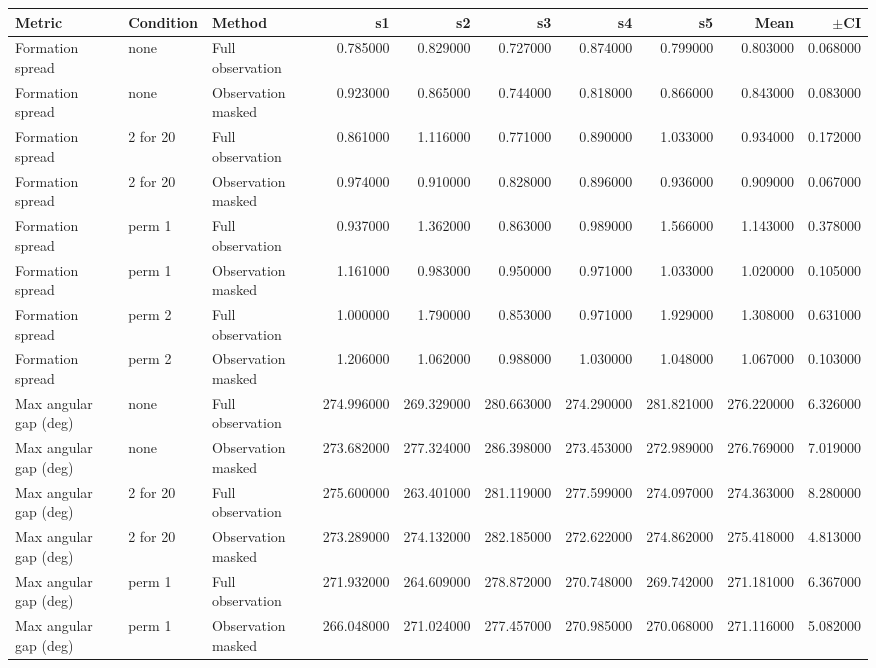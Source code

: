 \begin{tabular}{lllrrrrrrr}
\toprule
Metric & Condition & Method & s1 & s2 & s3 & s4 & s5 & Mean & $\pm$CI \\
\midrule
Formation spread & none & Full observation & 0.785000 & 0.829000 & 0.727000 & 0.874000 & 0.799000 & 0.803000 & 0.068000 \\
Formation spread & none & Observation masked & 0.923000 & 0.865000 & 0.744000 & 0.818000 & 0.866000 & 0.843000 & 0.083000 \\
Formation spread & 2 for 20 & Full observation & 0.861000 & 1.116000 & 0.771000 & 0.890000 & 1.033000 & 0.934000 & 0.172000 \\
Formation spread & 2 for 20 & Observation masked & 0.974000 & 0.910000 & 0.828000 & 0.896000 & 0.936000 & 0.909000 & 0.067000 \\
Formation spread & perm  1 & Full observation & 0.937000 & 1.362000 & 0.863000 & 0.989000 & 1.566000 & 1.143000 & 0.378000 \\
Formation spread & perm  1 & Observation masked & 1.161000 & 0.983000 & 0.950000 & 0.971000 & 1.033000 & 1.020000 & 0.105000 \\
Formation spread & perm  2 & Full observation & 1.000000 & 1.790000 & 0.853000 & 0.971000 & 1.929000 & 1.308000 & 0.631000 \\
Formation spread & perm  2 & Observation masked & 1.206000 & 1.062000 & 0.988000 & 1.030000 & 1.048000 & 1.067000 & 0.103000 \\
Max angular gap (deg) & none & Full observation & 274.996000 & 269.329000 & 280.663000 & 274.290000 & 281.821000 & 276.220000 & 6.326000 \\
Max angular gap (deg) & none & Observation masked & 273.682000 & 277.324000 & 286.398000 & 273.453000 & 272.989000 & 276.769000 & 7.019000 \\
Max angular gap (deg) & 2 for 20 & Full observation & 275.600000 & 263.401000 & 281.119000 & 277.599000 & 274.097000 & 274.363000 & 8.280000 \\
Max angular gap (deg) & 2 for 20 & Observation masked & 273.289000 & 274.132000 & 282.185000 & 272.622000 & 274.862000 & 275.418000 & 4.813000 \\
Max angular gap (deg) & perm  1 & Full observation & 271.932000 & 264.609000 & 278.872000 & 270.748000 & 269.742000 & 271.181000 & 6.367000 \\
Max angular gap (deg) & perm  1 & Observation masked & 266.048000 & 271.024000 & 277.457000 & 270.985000 & 270.068000 & 271.116000 & 5.082000 \\

\end{tabular}
